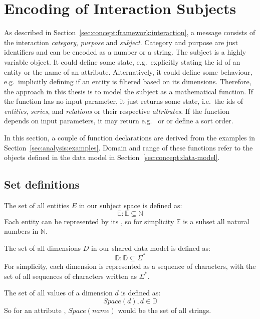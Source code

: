 \section{Encoding of Interaction Subjects}\label{sec:concept:message-interface}

As described in Section~\ref{sec:concept:framework:interaction}, a message consists of the interaction \emph{category}, \emph{purpose} and \emph{subject}.
Category and purpose are just identifiers and can be encoded as a number or a string.
The subject is a highly variable object.
It could define some state, e.g.\ explicitly stating the id of an entity or the name of an attribute.
Alternatively, it could define some behaviour, e.g.\ implicitly defining if an entity is filtered based on its dimensions.
Therefore, the approach in this thesis is to model the subject as a mathematical function.
If the function has no input parameter, it just returns some state, i.e.\ the ids of \emph{entities}, \emph{series}, and \emph{relations} or their respective \emph{attributes}.
If the function depends on input parameters, it may return e.g.\  or  or define a sort order.

In this section, a couple of function declarations are derived from the examples in Section~\ref{sec:analysis:examples}.
Domain and range of these functions refer to the objects defined in the data model in Section~\ref{sec:concept:data-model}.

\subsection{Set definitions}
The set of all entities $E$ in our subject space is defined as:
\begin{equation} \mathbb{E} : \mathbb{E} \subseteq \mathbb{N}  \end{equation}
Each entity can be represented by its , so for simplicity $\mathbb{E}$ is a subset all natural numbers in $\mathbb{N}$.

The set of all dimensions $D$ in our shared data model is defined as:
\begin{equation} \mathbb{D} : \mathbb{D} \subseteq \Sigma^* \end{equation}
For simplicity, each dimension is represented as a sequence of characters, with the set of all sequences of characters written as $ \Sigma^*$.

The set of all values of a dimension $d$ is defined as:
\begin{equation} Space(d), d \in \mathbb{D} \end{equation}
So for an attribute , $Space(name)$ would be the set of all strings.

